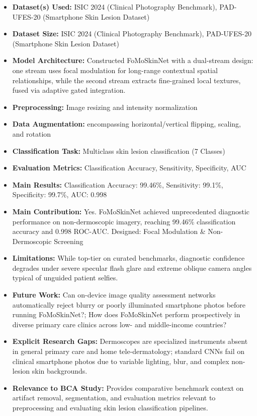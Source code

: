 \documentclass[11pt,a4paper]{article}
\begin{document}
\begin{itemize}\small
\item \textbf{Dataset(s) Used:} ISIC 2024 (Clinical Photography Benchmark), PAD-UFES-20 (Smartphone Skin Lesion Dataset)
\item \textbf{Dataset Size:} ISIC 2024 (Clinical Photography Benchmark), PAD-UFES-20 (Smartphone Skin Lesion Dataset)
\item \textbf{Model Architecture:} Constructed FoMoSkinNet with a dual-stream design: one stream uses focal modulation for long-range contextual spatial relationships, while the second stream extracts fine-grained local textures, fused via adaptive gated integration.
\item \textbf{Preprocessing:} Image resizing and intensity normalization
\item \textbf{Data Augmentation:} encompassing horizontal/vertical flipping, scaling, and rotation
\item \textbf{Classification Task:} Multiclass skin lesion classification (7 Classes)
\item \textbf{Evaluation Metrics:} Classification Accuracy, Sensitivity, Specificity, AUC
\item \textbf{Main Results:} Classification Accuracy: 99.46\%, Sensitivity: 99.1\%, Specificity: 99.7\%, AUC: 0.998
\item \textbf{Main Contribution:} Yes. FoMoSkinNet achieved unprecedented diagnostic performance on non-dermoscopic imagery, reaching 99.46\% classification accuracy and 0.998 ROC-AUC. Designed: Focal Modulation \& Non-Dermoscopic Screening
\item \textbf{Limitations:} While top-tier on curated benchmarks, diagnostic confidence degrades under severe specular flash glare and extreme oblique camera angles typical of unguided patient selfies.
\item \textbf{Future Work:} Can on-device image quality assessment networks automatically reject blurry or poorly illuminated smartphone photos before running FoMoSkinNet?; How does FoMoSkinNet perform prospectively in diverse primary care clinics across low- and middle-income countries?
\item \textbf{Explicit Research Gaps:} Dermoscopes are specialized instruments absent in general primary care and home tele-dermatology; standard CNNs fail on clinical smartphone photos due to variable lighting, blur, and complex non-lesion skin backgrounds.
\item \textbf{Relevance to BCA Study:} Provides comparative benchmark context on artifact removal, segmentation, and evaluation metrics relevant to preprocessing and evaluating skin lesion classification pipelines.
\end{itemize}
\end{document}
